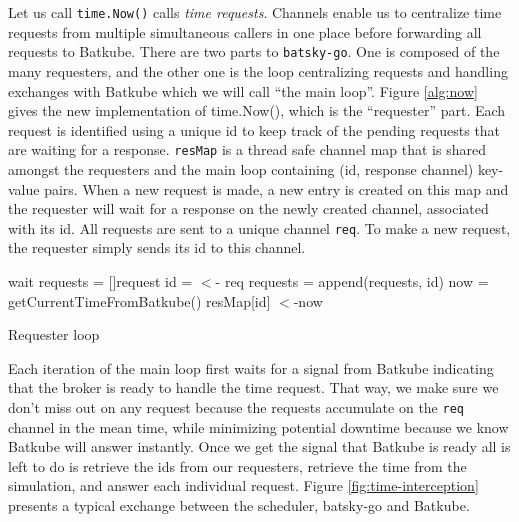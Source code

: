 Let us call \texttt{time.Now()} calls \textit{time requests}. Channels enable
us to centralize time requests from multiple simultaneous callers in one place
before forwarding all requests to Batkube. There are two parts to
\texttt{batsky-go}. One is composed of the many requesters, and the other one
is the loop centralizing requests and handling exchanges with Batkube which we
will call ``the main loop''.  Figure \ref{alg:now} gives the new implementation
of time.Now(), which is the ``requester'' part. Each request is identified
using a unique id to keep track of the pending requests that are waiting for a
response. \texttt{resMap} is a thread safe channel map that is shared amongst
the requesters and the main loop containing (id, response channel) key-value
pairs. When a new request is made, a new entry is created on this map and the
requester will wait for a response on the newly created channel, associated
with its id. All requests are sent to a unique channel \texttt{req}. To make a
new request, the requester simply sends its id to this channel.

\begin{algorithm}[]
\DontPrintSemicolon
{}
 {
	wait\;
}
requests = []request\;
 {
	id = $<$- req 
	requests = append(requests, id)\;
}
now = getCurrentTimeFromBatkube()\;
 {
	resMap[id] $<$-now 
}

\caption{Requester loop}
\label{alg:reqLoop}
\end{algorithm}

Each iteration of the main loop first waits for a signal from Batkube
indicating that the broker is ready to handle the time request. That way, we
make sure we don't miss out on any request because the requests accumulate on
the \texttt{req} channel in the mean time, while minimizing potential downtime
because we know Batkube will answer instantly. Once we get the signal that
Batkube is ready all is left to do is retrieve the ids from our requesters,
retrieve the time from the simulation, and answer each individual request.
Figure \ref{fig:time-interception} presents a typical exchange between the
scheduler, batsky-go and Batkube.

